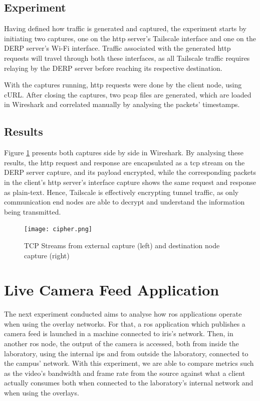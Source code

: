 \documentclass[11pt,twoside,a4paper]{report}
\begin{document}
\subsection{Experiment}

Having defined how traffic is generated and captured, the experiment starts by initiating two captures, one on the \ac{http} server's Tailscale interface and one on the \ac{DERP} server's Wi-Fi interface. Traffic associated with the generated \ac{http} requests will travel through both these interfaces, as all Tailscale traffic requires relaying by the \ac{DERP} server before reaching its respective destination.

With the captures running, \ac{http} requests were done by the client node, using cURL. After closing the captures, two pcap files are generated, which are loaded in Wireshark and correlated manually by analysing the packets' timestamps.

\subsection{Results}

Figure \ref{fig:cipher} presents both captures side by side in Wireshark. By analysing these results, the \ac{http} request and response are encapsulated as a \ac{tcp} stream on the \ac{DERP} server capture, and its payload encrypted, while the corresponding packets in the client's \ac{http} server's interface capture shows the same request and response as plain-text. Hence, Tailscale is effectively encrypting tunnel traffic, as only communication end nodes are able to decrypt and understand the information being transmitted.

\begin{figure}[h]
\centering
  \texttt{[image: cipher.png]}
  \caption{TCP Streams from external capture (left) and destination node capture (right)}
  \label{fig:cipher}
\end{figure}

\section{Live Camera Feed Application}

The next experiment conducted aims to analyse how \ac{ros} applications operate when using the overlay networks. For that, a \ac{ros} application which publishes a camera feed is launched in a machine connected to \ac{iris}'s network. Then, in another \ac{ros} node, the output of the camera is accessed, both from inside the laboratory, using the internal \acp{ip} and from outside the laboratory, connected to the campus' network. With this experiment, we are able to compare metrics such as the video's bandwidth and frame rate from the source against what a client actually consumes both when connected to the laboratory's internal network and when using the overlays.
\end{document}
